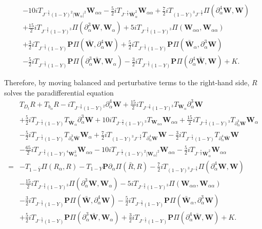 \documentclass[10pt]{amsart}
\theoremstyle{remark}
\theoremstyle{definition}
\numberwithin{equation}{section}
\newcommand{\p}{\partial}
\newcommand{\al}{\alpha}
\newcommand{\f}{\frac}
\newcommand{\bw}{\mathbf{W}}
\newcommand{\nP}{{\mathbf P}}
\begin{document}
\begin{align*}
&-10iT_{J^{-\f52}(1-Y)^2|\bw_{\al}|^2}\bw_{\al\al}-\f{5}{2}iT_{J^{-\f72}\bar{\bw}_{\al}^2}\bw_{\al\al}+\f72i T_{(1-Y)^3J^{-\f32}}\Pi(\p^4_{\al}\bw,\bw)\\
&+\f{15}{2}iT_{J^{-\f32}(1-Y)^3}\Pi(\p^3_{\al}\bw,\bw_{\al}) +5iT_{J^{-\f32}(1-Y)^3}\Pi(\bw_{\al\al},\bw_{\al\al})\\
&+\f32i T_{J^{-\f52}(1-Y)}\nP\Pi(\bar{\bw}, \p^4_{\al}\bw)+\f52i T_{J^{-\f52}(1-Y)}\nP\Pi(\bar{\bw}_{\al}, \p^3_{\al}\bw)\\
&-\f52i T_{J^{-\f52}(1-Y)}\nP\Pi(\p^3_{\al}\bar{\bw}, \bw_{\al}) -\f32i T_{J^{-\f52}(1-Y)}\nP\Pi(\p^4_{\al}\bar{\bw}, \bw) +K.
\end{align*}


Therefore, by moving balanced and perturbative terms to the right-hand side, $R$ solves the paradifferential equation
\begin{align*}
&T_{D_t}R + T_{b_\alpha}R -iT_{J^{-\f32}(1-Y)^2}\p^4_{\al}\bw+\f{15}{2}iT_{J^{-\f32}(1-Y)^3}T_{\bw_{\al}}\p^{3}_{\al}\bw\\
&+\f52iT_{J^{-\f52}(1-Y)}T_{\bar{\bw}_{\al}}\p^3_{\al}\bw+10iT_{J^{-\f32}(1-Y)^3}T_{\bw_{\al\al}}\bw_{\al\al}+\f{15}{2}iT_{J^{-\f32}(1-Y)^3}T_{\p^3_{\al}\bw}\bw_{\al}\\
&-\f52 iT_{J^{-\f52}(1-Y)}T_{\p^3_{\al}\bar{\bw}}
\bw_{\al} +\f72iT_{(1-Y)^3J^{-\f32}}T_{\p^4_{\al}\bw}\bw - \f32i T_{J^{-\f52}(1-Y)}T_{\p^4_{\al}\bar{\bw}} \bw\\
&-\f{65}{2}iT_{J^{-\f32}(1-Y)^4\bw_{\al}^2}\bw_{\al\al}-10iT_{J^{-\f52}(1-Y)^2|\bw_{\al}|^2}\bw_{\al\al}-\f{5}{2}iT_{J^{-\f72}\bar{\bw}_{\al}^2}\bw_{\al\al} \\
=&-T_{1-\bar{Y}}\Pi(R_\alpha, R) - T_{1-Y}\nP \p_\al\Pi(\bar{R}, R) -\f72i T_{(1-Y)^3J^{-\f32}}\Pi(\p^4_{\al}\bw,\bw) \\
&-\f{15}{2}iT_{J^{-\f32}(1-Y)^3}\Pi(\p^3_{\al}\bw,\bw_{\al}) -5iT_{J^{-\f32}(1-Y)^3}\Pi(\bw_{\al\al},\bw_{\al\al})\\
&-\f32i T_{J^{-\f52}(1-Y)}\nP\Pi(\bar{\bw}, \p^4_{\al}\bw)-\f52i T_{J^{-\f52}(1-Y)}\nP\Pi(\bar{\bw}_{\al}, \p^3_{\al}\bw)\\
&+\f52i T_{J^{-\f52}(1-Y)}\nP\Pi(\p^3_{\al}\bar{\bw}, \bw_{\al}) +\f32i T_{J^{-\f52}(1-Y)}\nP\Pi(\p^4_{\al}\bar{\bw}, \bw) + K.
\end{align*}    
\end{document}
